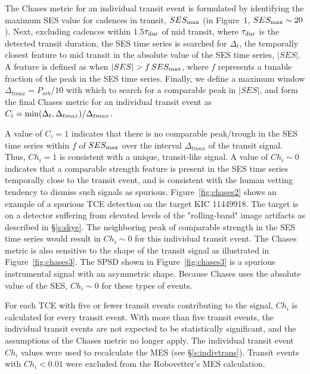 The Chases metric for an individual transit event is formulated by identifying the maximum SES value for cadences in transit, $SES_{\rm max}$ (in Figure~1, $SES_{\rm max}\sim20$).  Next, excluding cadences within 1.5$\tau_{\rm dur}$ of mid transit, where $\tau_{\rm dur}$ is the detected transit duration, the SES time series is searched for $\Delta_{t}$, the temporally closest feature to mid transit in the absolute value of the SES time series, $\lvert SES \rvert$. A feature is defined as when  $\lvert SES \rvert>f\, SES_{\rm max}$, where $f$ represents a tunable fraction of the peak in the SES time series.  Finally, we define a maximum window $\Delta_{tmax}=P_{orb}/10$ with which to search for a comparable peak in $\lvert SES \rvert$, and form the final Chases metric for an individual transit event as $C_{i} = {\rm min}(\Delta_{t},\Delta_{tmax})/\Delta_{tmax}$.  

A value of $C_{i}=1$ indicates that there is no comparable peak/trough in the SES time series within $f$ of $SES_{\rm max}$ over the interval $\Delta_{tmax}$ of the transit signal.  Thus, $Ch_{i}=1$ is consistent with a unique, transit-like signal.  A value of $Ch_{i}\sim0$ indicates that a comparable strength feature is present in the SES time series temporally close to the transit event, and is consistent with the human vetting tendency to dismiss such signals as spurious.  Figure~\ref{fig:chases2} shows an example of a spurious TCE detection on the target KIC 11449918.  The target is on a detector suffering from elevated levels of the "rolling-band" image artifacts as described in \S\ref{s:skye}.  The neighboring peak of comparable strength in the SES time series would result in $Ch_{i}\sim0$ for this individual transit event.  The Chases metric is also sensitive to the shape of the transit signal as illustrated in Figure~\ref{fig:chases3}. The SPSD shown in Figure~\ref{fig:chases3} is a spurious instrumental signal with an asymmetric shape. Because Chases uses the absolute value of the SES, $Ch_{i}\sim0$ for these types of events.


For each TCE with five or fewer transit events contributing to the signal, $Ch_{i}$ is calculated for every transit event.  With more than five transit events, the individual transit events are not expected to be statistically significant, and the assumptions of the Chases metric no longer apply. The individual transit event $Ch_{i}$ values were used to recalculate the MES (see \S\ref{s:indivtrans}). Transit events with $Ch_{i}<0.01$ were excluded from the Robovetter's MES calculation.

